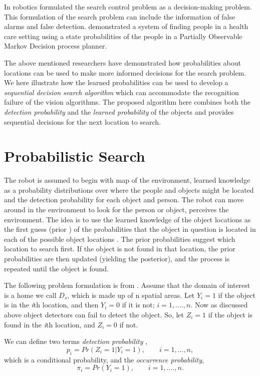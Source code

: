 In robotics \cite{chung2007decision} formulated the search control problem as a decision-making problem. This formulation of the search problem can include the information of false alarms and false detection. \cite{roy2003planning} demonstrated a system of finding people in a health care setting using a state probabilities of the people in a Partially Observable Markov Decision process planner. 

The above mentioned researchers have demonstrated how probabilities about locations can be used to make more informed decisions for the search problem. We here illustrate how the learned probabilities can be used to develop a \emph{sequential decision search algorithm} which can accommodate the recognition failure of the vision algorithms. The proposed algorithm here combines both the \emph{detection probability} and the \emph{learned probability} of the objects and provides sequential decisions for the next location to search.

\section{Probabilistic Search}

The robot is assumed to begin with map of the environment, learned knowledge as a probability distributions over where the people and objects might be located and the detection probability for each object and person. The robot can move around in the environment to look for the person or object, perceives the environment. 
The idea is to use the learned knowledge of the object locations as the first guess (prior ) of the probabilities that the object in question is located in each of the possible object locations \cite{cressie2015statistics}. The prior probabilities suggest which location to search first. If the object is not found in that location, the prior probabilities are then updated (yielding the posterior), and the process is repeated until the object is found. 

The following problem formulation is from \cite[p. 25]{cressie2015statistics}.
Assume that the domain of interest is a home we call $D_s$, which is made up of n spatial areas. Let $Y_i = 1$ if the object is in the \emph{i}th location, and then $Y_i = 0$ if it is not; $ i = 1, .... , n$. Now as discussed above object detectors can fail to detect the object. So, let $Z_i = 1$ if the object is found in the \emph{i}th location, and $Z_i = 0$ if not.

We can define two terms \emph{detection probability} ,
\begin{equation}
	p_i = Pr(Z_i = 1| Y_i =1), \qquad  i = 1,...,n,
\end{equation}
which is a conditional probability, and the \emph{occurrence probability},
\begin{equation}
	\pi_i = Pr(Y_i = 1),\qquad  i = 1, .... , n.
\end{equation}

